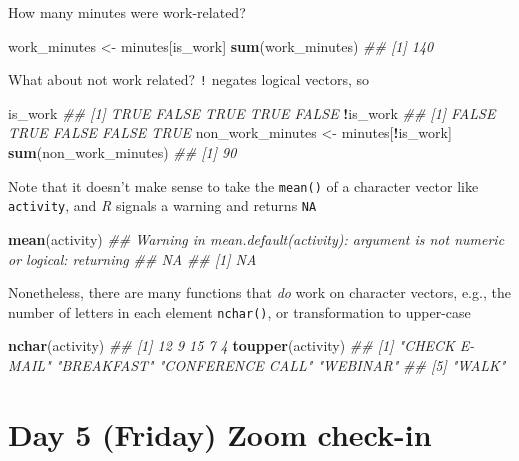 \documentclass[]{book}
\newenvironment{Shaded}{\begin{snugshade}}{\end{snugshade}}
\newcommand{\CommentTok}[1]{\textcolor[rgb]{0.56,0.35,0.01}{\textit{#1}}}
\newcommand{\KeywordTok}[1]{\textcolor[rgb]{0.13,0.29,0.53}{\textbf{#1}}}
\newcommand{\NormalTok}[1]{#1}
\newcommand{\OperatorTok}[1]{\textcolor[rgb]{0.81,0.36,0.00}{\textbf{#1}}}
\newcommand{\StringTok}[1]{\textcolor[rgb]{0.31,0.60,0.02}{#1}}
\begin{document}
How many minutes were work-related?

\begin{Shaded}
\begin{Highlighting}[]
\NormalTok{work_minutes <-}\StringTok{ }\NormalTok{minutes[is_work]}
\KeywordTok{sum}\NormalTok{(work_minutes)}
\CommentTok{## [1] 140}
\end{Highlighting}
\end{Shaded}

What about not work related? \texttt{!} negates logical vectors, so

\begin{Shaded}
\begin{Highlighting}[]
\NormalTok{is_work}
\CommentTok{## [1]  TRUE FALSE  TRUE  TRUE FALSE}
\OperatorTok{!}\NormalTok{is_work}
\CommentTok{## [1] FALSE  TRUE FALSE FALSE  TRUE}
\NormalTok{non_work_minutes <-}\StringTok{ }\NormalTok{minutes[}\OperatorTok{!}\NormalTok{is_work]}
\KeywordTok{sum}\NormalTok{(non_work_minutes)}
\CommentTok{## [1] 90}
\end{Highlighting}
\end{Shaded}

Note that it doesn't make sense to take the \texttt{mean()} of a character vector like \texttt{activity}, and \emph{R} signals a warning and returns \texttt{NA}

\begin{Shaded}
\begin{Highlighting}[]
\KeywordTok{mean}\NormalTok{(activity)}
\CommentTok{## Warning in mean.default(activity): argument is not numeric or logical: returning}
\CommentTok{## NA}
\CommentTok{## [1] NA}
\end{Highlighting}
\end{Shaded}

Nonetheless, there are many functions that \emph{do} work on character vectors, e.g., the number of letters in each element \texttt{nchar()}, or transformation to upper-case

\begin{Shaded}
\begin{Highlighting}[]
\KeywordTok{nchar}\NormalTok{(activity)}
\CommentTok{## [1] 12  9 15  7  4}
\KeywordTok{toupper}\NormalTok{(activity)}
\CommentTok{## [1] "CHECK E-MAIL"    "BREAKFAST"       "CONFERENCE CALL" "WEBINAR"        }
\CommentTok{## [5] "WALK"}
\end{Highlighting}
\end{Shaded}

\hypertarget{day-5-friday-zoom-check-in}{%
\section{Day 5 (Friday) Zoom check-in}\label{day-5-friday-zoom-check-in}}
\end{document}

